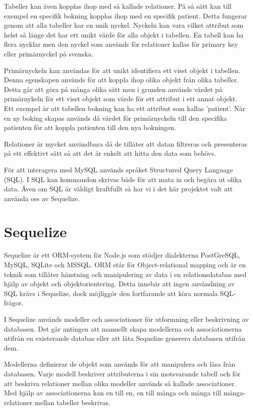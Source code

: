 Tabeller kan även kopplas ihop med så kallade relationer. På så sätt kan till exempel en specifik bokning kopplas ihop med en specifik patient. Detta fungerar genom att alla tabeller har en unik nyckel. Nyckeln kan vara vilket attribut som helst så länge det har ett unikt värde för alla objekt i tabellen. En tabell kan ha flera nycklar men den nyckel som används för relationer kallas för primary key eller primärnyckel på svenska.

Primärnyckeln kan användas för att unikt identifiera ett visst objekt i tabellen. Denna egenskapen används för att koppla ihop olika objekt från olika tabeller. Detta går att göra på många olika sätt men i grunden används värdet på primärnykeln för ett visst objekt som värde för ett attribut i ett annat objekt. Ett exempel är att tabellen bokning kan ha ett attribut som kallas 'patient'. När en ny boking skapas används då värdet för primärnyckeln till den specifika patienten för att koppla patienten till den nya bokningen.

Relationer är mycket användbara då de tillåter att datan filtreras och presenteras på ett effektivt sätt så att det är enkelt att hitta den data som behövs.

För att interagera med MySQL används språket Structured Query Language (SQL). I SQL kan kommandon skrivas både för att mata in och begära ut olika data. Även om SQL är väldigt kraftfullt så har vi i det här projektet valt att använda oss av Sequelize.


\section{Sequelize}\label{sec:sequelize_teori}
Sequelize är ett ORM-system för Node.js som stödjer dialekterna PostGreSQL, MySQL, SQLite och MSSQL. \cite{sequelize} ORM står för Object-relational mapping och är en teknik som tillåter hämtning och manipulering av data i en relationsdatabas med hjälp av objekt och objektorientering. Detta innebär att ingen användning av SQL krävs i Sequelize, dock möjliggör den fortfarande att köra normala SQL-frågor.

I Sequelize används modeller och associationer för utformning eller beskrivning av databasen. Det går antingen att manuellt skapa modellerna och associationerna utifrån en existerande databas eller att låta Sequelize generera databasen utifrån dem.

Modellerna definierar de objekt som används för att manipulera och läsa från databasen. Varje modell beskriver attributerna i sin motsvarande tabell och för att beskriva relationer mellan olika modeller används så kallade associationer. Med hjälp av associationerna kan en till en, en till många och många till många-relationer mellan tabeller beskrivas.

